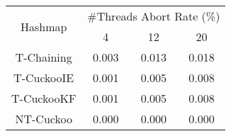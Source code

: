 \begin{tabular}{|c|c|c|c|}
\hline
\multirow{2}{*}{Hashmap} & \multicolumn{3}{c|}{\#Threads Abort Rate (\%)}\\\cline{2-4}& 4 & 12 & 20\\
\hline
\hline
T-Chaining & 0.003 & 0.013 & 0.018\\
T-CuckooIE & 0.001 & 0.005 & 0.008\\
T-CuckooKF & 0.001 & 0.005 & 0.008\\
NT-Cuckoo & 0.000 & 0.000 & 0.000\\
\hline
\end{tabular}
